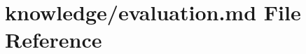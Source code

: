 \hypertarget{evaluation_8md}{}\section{knowledge/evaluation.md File Reference}
\label{evaluation_8md}
